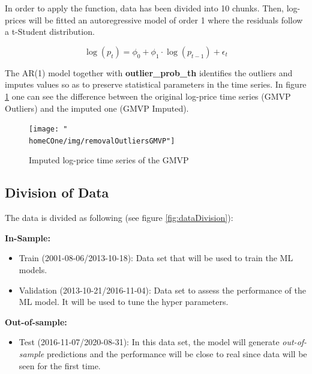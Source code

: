\documentclass[a4paper]{article}
\newcommand{\homeCOne}{../../Chapter 1 - Metalabeling/Draft}
\begin{document}
In order to apply the function, data has been divided into 10 chunks. 
Then, log-prices will be fitted an autoregressive model of order 1 
where the residuals follow a t-Student distribution.


\begin{equation*}
	\log (p_t) = \phi_0 + \phi_1 \cdot \log (p_{t-1}) + \epsilon_t
\end{equation*}

The AR(1) model together with \textbf{outlier\_prob\_th} identifies 
the outliers  and imputes values so as to preserve statistical 
parameters in the time series. In figure \ref{fig:removalOutlierGMVP} 
one can see the difference between the original log-price time series 
(GMVP Outliers) and the imputed one (GMVP Imputed).

\begin{figure}[htbp]
	\centering
	\texttt{[image: "\\homeCOne/img/removalOutliersGMVP"]}
	\caption{Imputed log-price time series of the GMVP}
	\label{fig:removalOutlierGMVP}
\end{figure}

\subsection{Division of Data}
The data is divided as following (see figure \ref{fig:dataDivision}):

\vspace{.1cm}

\textbf{In-Sample:}
\begin{itemize}
	\item Train (2001-08-06/2013-10-18): Data set that will be used to 
	train the ML models.
	
	\item Validation (2013-10-21/2016-11-04): Data set to assess the 
	performance of the ML model. It will be used to tune the 
	hyper parameters.
\end{itemize}

\textbf{Out-of-sample:}
\begin{itemize}
	\item Test (2016-11-07/2020-08-31): In this data set, the model 
	will generate \textit{out-of-sample} predictions and the 
	performance will be close to real since data will be seen for the 
	first time.
\end{itemize}
\end{document}
